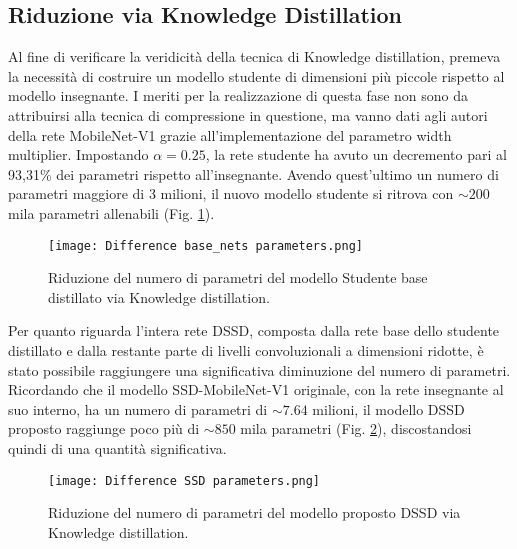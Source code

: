 \subsection{Riduzione via Knowledge Distillation}
Al fine di verificare la veridicità della tecnica di Knowledge distillation, 
premeva la necessità di costruire un modello studente di dimensioni più 
piccole rispetto al modello insegnante. I meriti per la realizzazione di questa 
fase non sono da attribuirsi alla tecnica di compressione in questione, ma 
vanno dati agli autori della rete MobileNet-V1 grazie all'implementazione del 
parametro width multiplier. Impostando $\alpha=0.25$, la rete studente ha avuto 
un decremento pari al 93,31\% dei parametri rispetto all'insegnante. Avendo 
quest'ultimo un numero di parametri maggiore di 3 milioni, il nuovo modello 
studente si ritrova con $\sim{200}$ mila parametri allenabili (Fig. \ref{base_net_par}).
\begin{figure}
    \centering
    \texttt{[image: Difference base\_nets parameters.png]}
    \centering
    \caption{Riduzione del numero di parametri del modello Studente base distillato via Knowledge distillation.}
    \label{base_net_par}
\end{figure}
Per quanto riguarda l'intera rete DSSD, composta dalla rete base dello studente 
distillato e dalla restante parte di livelli convoluzionali a dimensioni ridotte, 
è stato possibile raggiungere una significativa diminuzione del numero di 
parametri. Ricordando che il modello SSD-MobileNet-V1 originale, con la 
rete insegnante al suo interno, ha un numero di parametri di $\sim{7.64}$ milioni, 
il modello DSSD proposto raggiunge poco più di $\sim{850}$ mila parametri (Fig. 
\ref{SSD_par}), discostandosi quindi di una quantità significativa.
\begin{figure}
    \centering
    \texttt{[image: Difference SSD parameters.png]}
    \centering
    \caption{Riduzione del numero di parametri del modello proposto DSSD via Knowledge distillation.}
    \label{SSD_par}
\end{figure}

